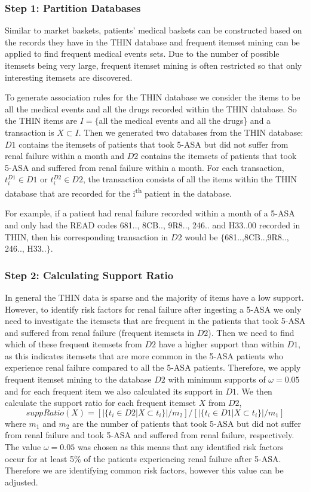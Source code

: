 \documentclass{llncs}
\begin{document}
\subsubsection{Step 1: Partition Databases}
Similar to market baskets, patients’ medical baskets can be constructed based on the records they have in the THIN database and frequent itemset mining can be applied to find frequent medical events sets. Due to the number of possible itemsets being very large, frequent itemset mining is often restricted so that only interesting itemsets are discovered.

To generate association rules for the THIN database we consider the items to be all the medical events and all the drugs recorded within the THIN database. So the THIN items are $I = \{$all the medical events and all the drugs\} and a transaction is $X \subset I$. Then we generated two databases from the THIN database: $D1$ contains the itemsets of patients that took 5-ASA but did not suffer from renal failure within a month and $D2$ contains the itemsets of patients that took 5-ASA and suffered from renal failure within a month. For each transaction, $t_{i}^{D1} \in D1$ or $t_{i}^{D2} \in D2$, the transaction consists of all the items within the THIN database that are recorded for the i\textsuperscript{th} patient in the database.

For example, if a patient had renal failure recorded within a month of a 5-ASA and only had the READ codes 681.., 8CB.., 9R8.., 246.. and H33..00 recorded in THIN, then his corresponding transaction in $D2$ would be $\{$681..,8CB..,9R8.., 246.., H33..$\}$. 

\subsubsection{Step 2: Calculating Support Ratio}
In general the THIN data is sparse and the majority of items have a low support. However, to identify risk factors for renal failure after ingesting a 5-ASA we only need to investigate the itemsets that are frequent in the patients that took 5-ASA and suffered from renal failure (frequent itemsets in $D2$). Then we need to find which of these frequent itemsets from $D2$ have a higher support than within $D1$, as this indicates itemsets that are more common in the 5-ASA patients who experience renal failure compared to all the 5-ASA patients. Therefore, we apply frequent itemset mining to the database $D2$ with minimum supports of $\omega=0.05$ and for each frequent item we also calculated its support in $D1$. We then calculate the support ratio for each frequent itemset $X$ from $D2$,
\begin{equation}
suppRatio(X) = [|\{ t_{i} \in D2 | X \subset t_{i} \} |/m_{2}]/ [|\{ t_{i} \in D1 | X \subset t_{i} \} |/m_{1}]
\end{equation}
where $m_{1}$ and $m_{2}$ are the number of patients that took 5-ASA but did not suffer from renal failure and took 5-ASA and suffered from renal failure, respectively. The value $\omega=0.05$ was chosen as this means that any identified risk factors occur for at least 5\% of the patients experiencing renal failure after 5-ASA. Therefore we are identifying common risk factors, however this value can be adjusted.
\end{document}
